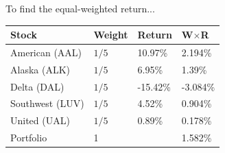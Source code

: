 To find the equal-weighted return...
\begin{center}
	{\color{blue}
	\begin{tabular}{l|lll}
		\textbf{Stock} & \textbf{W}eight & \textbf{R}eturn & \textbf{W}$\times$\textbf{R}\\ \hline
		American (AAL) & $1/5$ & 10.97\% & 2.194\% \\
		Alaska (ALK) & $1/5$ & 6.95\% & 1.39\% \\
		Delta (DAL) & $1/5$ & -15.42\% & -3.084\% \\
		Southwest (LUV) & $1/5$ & 4.52\% & 0.904\% \\
		United (UAL) & $1/5$ & 0.89\% & 0.178\% \\ \hline 
		Portfolio & 1 && 1.582\% \\\hline
	\end{tabular}
	}
\end{center}